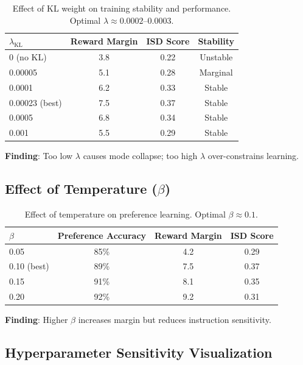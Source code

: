 \begin{table}[H]
\centering
\small
\begin{tabular}{@{}lccc@{}}
\toprule
\textbf{$\lambda_{\text{KL}}$} & \textbf{Reward Margin} & \textbf{ISD Score} & \textbf{Stability} \\
\midrule
0 (no KL) & 3.8 & 0.22 & Unstable \\
0.00005 & 5.1 & 0.28 & Marginal \\
0.0001 & 6.2 & 0.33 & Stable \\
0.00023 (best) & 7.5 & 0.37 & Stable \\
0.0005 & 6.8 & 0.34 & Stable \\
0.001 & 5.5 & 0.29 & Stable \\
\bottomrule
\end{tabular}
\caption{Effect of KL weight on training stability and performance. Optimal $\lambda \approx 0.0002$--$0.0003$.}
\label{tab:kl_ablation}
\end{table}

\textbf{Finding}: Too low $\lambda$ causes mode collapse; too high $\lambda$ over-constrains learning.

\subsection{Effect of Temperature ($\beta$)}

\begin{table}[H]
\centering
\small
\begin{tabular}{@{}lccc@{}}
\toprule
\textbf{$\beta$} & \textbf{Preference Accuracy} & \textbf{Reward Margin} & \textbf{ISD Score} \\
\midrule
0.05 & 85\% & 4.2 & 0.29 \\
0.10 (best) & 89\% & 7.5 & 0.37 \\
0.15 & 91\% & 8.1 & 0.35 \\
0.20 & 92\% & 9.2 & 0.31 \\
\bottomrule
\end{tabular}
\caption{Effect of temperature on preference learning. Optimal $\beta \approx 0.1$.}
\label{tab:beta_ablation}
\end{table}

\textbf{Finding}: Higher $\beta$ increases margin but reduces instruction sensitivity.

\subsection{Hyperparameter Sensitivity Visualization}

